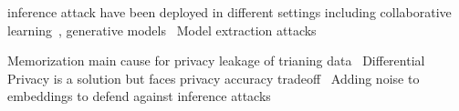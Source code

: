 inference attack have been deployed in different settings including collaborative learning~\cite{whitebox,collabinf}, generative models~\cite{logan}
Model extraction attacks~\cite{timing,csinn,stealml}


Memorization main cause for privacy leakage of trianing data~\cite{}
Differential Privacy is a solution but faces privacy accuracy tradeoff~\cite{diffpriv}
Adding noise to embeddings to defend against inference attacks~\cite{attriguard}
